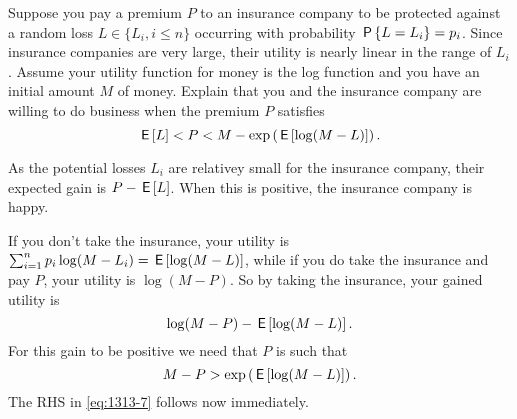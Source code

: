 \documentclass[lectures]{subfiles}
\begin{document}
\begin{exercise}
Suppose you pay a premium $P$ to an insurance company to be protected against a random loss $L \in \{L_{i}, i \leq n\}$ occurring with probability $\P{L = L_{i}} = p_{i}$.
Since insurance companies are very large, their utility is nearly linear in the range of $L_{i}$.
Assume your utility function for money is the log function and you have an initial amount $M$ of money.
Explain that you and the insurance company are willing to do business when the premium $P$ satisfies
\begin{equation}
  \label{eq:1313-7}
\E L < P <   M - \exp\left(\E{\log (M-L)}\right).
\end{equation}
\begin{solution}

As the potential losses $L_{i}$ are relativey small for  the insurance company, their expected gain is $P-\E L$. When this is positive, the insurance company is happy.

If you don't take the insurance, your utility is  $\sum_{i=1}^{n} p_{i} \log (M-L_{i}) = \E{\log(M-L)}$, while if you do take the insurance and pay $P$, your utility is $\log(M-P)$. So by taking the insurance, your gained utility is
\begin{equation}
  \label{eq:138}
\log(M-P) - \E{\log(M-L)}.
\end{equation}
For this gain to be  positive we need that $P$ is such that
\begin{equation}
  \label{eq:139}
M-P > \exp\left(\E{\log(M-L)}\right).
\end{equation}
The RHS in \cref{eq:1313-7} follows now immediately.
\end{solution}
\end{exercise}
\end{document}
